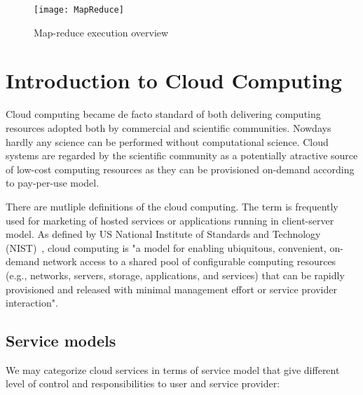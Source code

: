 \begin{figure}[tb]
   \centering
   \texttt{[image: MapReduce]}  
   \caption{Map-reduce execution overview\cite{Dean:2008:MapReduce}}
   \label{fig:intro:mapreduce}
\end{figure} 


\section{Introduction to Cloud Computing}
\label{intro:cloud}

Cloud computing became de facto standard of both delivering computing resources adopted both by commercial and scientific communities.  Nowdays hardly any science can be performed without computational science. Cloud systems are regarded by the scientific community as a potentially atractive source of low-cost computing resources as they can be provisioned on-demand according to pay-per-use model.

There are mutliple definitions of the cloud computing. The term is frequently used for marketing of hosted services or applications running in client-server model. As defined by US National Institute of Standards and Technology (NIST)~\cite{NISTCloudDef}, cloud computing is "a model for enabling ubiquitous, convenient, on-demand network access to a shared pool of configurable computing resources (e.g., networks, servers, storage, applications, and services) that can be rapidly provisioned and released with minimal management effort or service provider interaction".

\subsection{Service models}

We may categorize cloud services in terms of service model that give different level of control and responsibilities to user and service provider:

